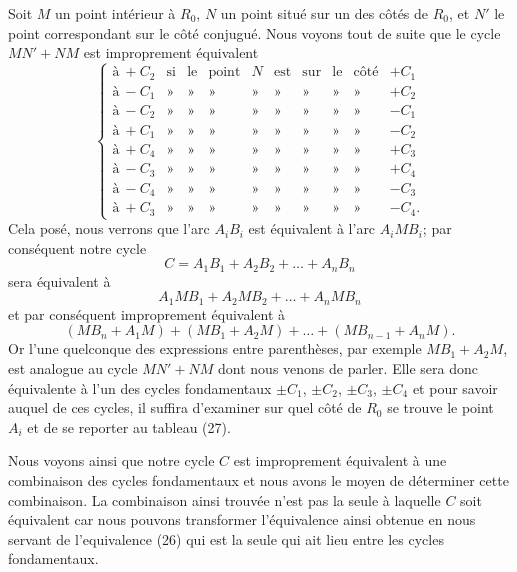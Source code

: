\documentclass{article}
\begin{document}
Soit $M$ un point intérieur à $R_{0}$, $N$ un point situé sur un des côtés de $R_{0}$, et $N'$ le point correspondant sur le côté conjugué. Nous voyons tout de suite que le cycle $MN' + NM$ est improprement équivalent
\[ \left\{ \begin{matrix} \text{à}\ +C_{2} & \text{si} & \text{le} & \text{point} & N & \text{est} & \text{sur} & \text{le} & \text{côté} & +C_{1} \\ \text{à}\ -C_{1} & \text{»} & \text{»} & \text{»} & \text{»} & \text{»} & \text{»} & \text{»} & \text{»} & +C_{2} \\ \text{à}\ -C_{2} & \text{»} & \text{»} & \text{»} & \text{»} & \text{»} & \text{»} & \text{»} & \text{»} & -C_{1} \\ \text{à}\ +C_{1} & \text{»} & \text{»} & \text{»} & \text{»} & \text{»} & \text{»} & \text{»} & \text{»} & -C_{2} \\ \text{à}\ +C_{4} & \text{»} & \text{»} & \text{»} & \text{»} & \text{»} & \text{»} & \text{»} & \text{»} & +C_{3} \\ \text{à}\ -C_{3} & \text{»} & \text{»} & \text{»} & \text{»} & \text{»} & \text{»} & \text{»} & \text{»} & +C_{4} \\ \text{à}\ -C_{4} & \text{»} & \text{»} & \text{»} & \text{»} & \text{»} & \text{»} & \text{»} & \text{»} & -C_{3} \\ \text{à}\ +C_{3} & \text{»} & \text{»} & \text{»} & \text{»} & \text{»} & \text{»} & \text{»} & \text{»} & -C_{4}. \end{matrix} \right. \tag{27} \]
Cela posé, nous verrons que l'arc $A_{i}B_{i}$ est équivalent à l'arc $A_{i}MB_{i}$; par conséquent notre cycle
\[ C = A_{1}B_{1} + A_{2}B_{2} + \ldots + A_{n}B_{n} \]
sera équivalent à
\[ A_{1}MB_{1} + A_{2}MB_{2} + \ldots + A_{n}MB_{n} \]
et par conséquent improprement équivalent à
\[ (MB_{n} + A_{1}M) + (MB_{1} + A_{2}M) + \ldots + (MB_{n-1} + A_{n}M). \]
Or l'une quelconque des expressions entre parenthèses, par exemple $MB_{1} + A_{2}M$, est analogue au cycle $MN' + NM$ dont nous venons de parler. Elle sera donc équivalente à l'un des cycles fondamentaux $\pm C_{1}$, $\pm C_{2}$, $\pm C_{3}$, $\pm C_{4}$ et pour savoir auquel de ces cycles, il suffira d'examiner sur quel côté de $R_{0}$ se trouve le point $A_{i}$ et de se reporter au tableau (27).


Nous voyons ainsi que notre cycle $C$ est improprement équivalent à une combinaison des cycles fondamentaux et nous avons le moyen de déterminer cette combinaison. La combinaison ainsi trouvée n'est pas la seule à laquelle $C$ soit équivalent car nous pouvons transformer l'équivalence ainsi obtenue en nous servant de l'equivalence (26) qui est la seule qui ait lieu entre les cycles fondamentaux.
\end{document}
